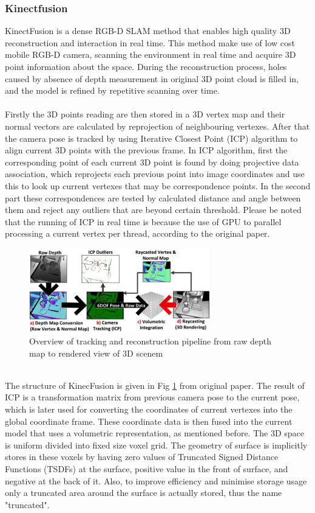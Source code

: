 \documentclass[12pt,twoside]{article}
\begin{document}
\subsubsection{Kinectfusion}
KinectFusion\cite{newcombe2011kinectfusion} is a dense RGB-D SLAM method that enables high quality 3D reconstruction and interaction in real time. This method make use of low cost mobile RGB-D camera, scanning the environment in real time and acquire 3D point information about the space. During the reconstruction process, holes caused by absence of depth measurement in original 3D point cloud is filled in, and the model is refined by repetitive scanning over time.\\
\\
Firstly the 3D points reading are then stored in a 3D vertex map and their normal vectors are calculated by reprojection of neighbouring vertexes. After that the camera pose is tracked by  using Iterative Closest Point (ICP)\citep{chen1992object}\citep{besl1992method} algorithm to align current 3D points with the previous frame. In ICP algorithm, first the corresponding point of each current 3D point is found by doing  projective data association, which reprojects each previous point into image coordinates and use this to look up current vertexes that may be correspondence points. In the second part these correspondences are tested by calculated distance and angle between them and reject any outliers that are beyond certain threshold. Please be noted that the running of ICP in real time is because the use of GPU to parallel processing a current vertex per thread, according to the original paper.\\
\begin{figure}[h]
    \centering
    \includegraphics[width=0.7\textwidth]{figures/kinec}
    \caption{Overview of tracking and reconstruction pipeline
from raw depth map to rendered view of 3D scenem\cite{newcombe2011kinectfusion}}
    \label{fig:kinec}
\end{figure}
\\The structure of KinecFusion is given in Fig \ref{fig:kinec} from original paper. The result of ICP is a transformation matrix from previous camera pose to the current pose, which is later used for converting the coordinates of current vertexes into the global coordinate frame. These coordinate data is then fused into the current model that uses a volumetric representation, as mentioned before. The 3D space is uniform divided into fixed size voxel grid. The geometry of surface is implicitly stores in these voxels by having zero values of Truncated Signed Distance Functions (TSDFs) at the surface, positive value in the front of surface, and negative at the back of it. Also, to improve efficiency and minimise storage usage only a truncated area around the surface is actually stored, thus the name "truncated".\\
\end{document}
